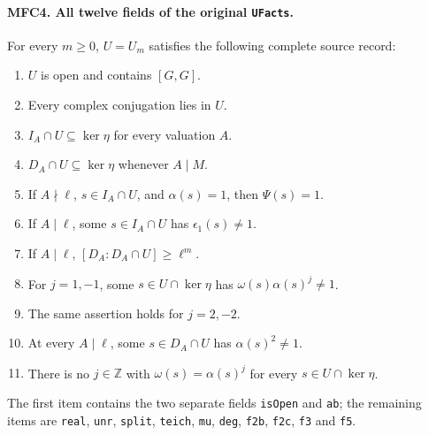 \documentclass[11pt,a4paper]{article}
\numberwithin{equation}{section}
\theoremstyle{remark}\newtheorem{remark}[theorem]{Remark}
\begin{document}
\paragraph{MFC4. All twelve fields of the original \texttt{UFacts}.}
\label{claim:MFC4}
For every \(m\ge0\), \(U=U_m\) satisfies the following
complete source record:
\begin{enumerate}
\item \(U\) is open and contains \([G,G]\).
\item Every complex conjugation lies in \(U\).
\item \(I_A\cap U\subseteq\ker\eta\) for every valuation \(A\).
\item \(D_A\cap U\subseteq\ker\eta\) whenever \(A\mid M\).
\item If \(A\nmid\ell\), \(s\in I_A\cap U\), and
      \(\alpha(s)=1\), then \(\Psi(s)=1\).
\item If \(A\mid\ell\), some \(s\in I_A\cap U\) has
      \(\epsilon_1(s)\ne1\).
\item If \(A\mid\ell\), \([D_A:D_A\cap U]\ge\ell^m\).
\item For \(j=1,-1\), some \(s\in U\cap\ker\eta\) has
      \(\omega(s)\alpha(s)^j\ne1\).
\item The same assertion holds for \(j=2,-2\).
\item At every \(A\mid\ell\), some \(s\in D_A\cap U\)
      has \(\alpha(s)^2\ne1\).
\item There is no \(j\in\mathbb Z\) with
      \(\omega(s)=\alpha(s)^j\) for every
      \(s\in U\cap\ker\eta\).
\end{enumerate}
The first item contains the two separate fields
\texttt{is\allowbreak Open} and \texttt{ab}; the remaining items are
\texttt{real}, \texttt{unr}, \texttt{split}, \texttt{teich},
\texttt{mu}, \texttt{deg}, \texttt{f2b}, \texttt{f2c},
\texttt{f3} and \texttt{f5}.
\end{document}
